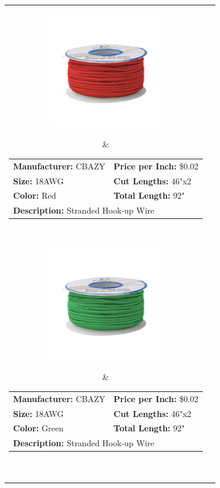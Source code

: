 \documentclass[12pt,letterpaper]{article}
\begin{document}
\begin{longtable}{c l}
\parbox[c]{5cm}{\includegraphics[width=5cm]{redwire.jpg} }
& \begin{tabular}{l l}
\textbf{Manufacturer:} CBAZY & \textbf{Price per Inch:} \$0.02 \\
\textbf{Size:} 18AWG & \textbf{Cut Lengths:} 46"x2 \\
\textbf{Color:} Red  & \textbf{Total Length:} 92" \\
\multicolumn{2}{p{8cm}}{\textbf{Description:} Stranded Hook-up Wire } \\
\end{tabular} \\

\parbox[c]{5cm}{\includegraphics[width=5cm]{greenwire.jpg} }
& \begin{tabular}{l l}
\textbf{Manufacturer:} CBAZY & \textbf{Price per Inch:} \$0.02 \\
\textbf{Size:} 18AWG & \textbf{Cut Lengths:} 46"x2 \\
\textbf{Color:} Green  & \textbf{Total Length:} 92" \\
\multicolumn{2}{p{8cm}}{\textbf{Description:} Stranded Hook-up Wire } \\
\end{tabular} \\


\end{longtable}
\end{document}
